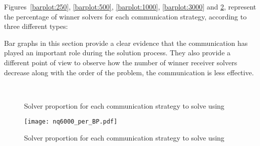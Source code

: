 Figures~\ref{barplot:250}, \ref{barplot:500}, \ref{barplot:1000}, \ref{barplot:3000} and \ref{barplot:6000}, represent the percentage of winner solvers for each communication strategy, according to three different types:


Bar graphs in this section provide a clear evidence that the communication has played an important role during the solution process. They also provide a different point of view to observe how the number of winner receiver solvers decrease along with the order of the problem, \ie the communication is less effective.

\begin{figure}[!h]
\centering
{} %
\\
\caption[]{Solver proportion for each communication strategy to solve \NQP{} using \posl}
\label{fig:bars_nq}
\end{figure}

\begin{figure}[!h]
\centering
\texttt{[image: nq6000\_per\_BP.pdf]}
\caption{Solver proportion for each communication strategy to solve \NQP{} using \posl}\label{barplot:6000}
\end{figure}